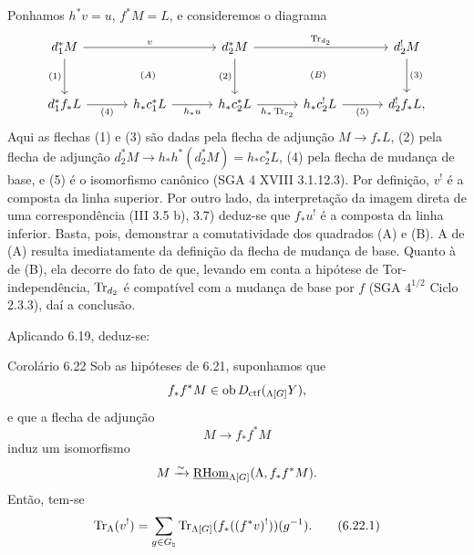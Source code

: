 Ponhamos $h^*v=u$, $f^*M=L$, e consideremos o diagrama
\[
\begin{tikzcd}[column sep=3.2em,row sep=large]
d_1^*M \arrow[rr,"v"] \arrow[d,"{(1)}"'] &&
d_2^*M \arrow[rr,"\Tr_{d_2}"] \arrow[d,"{(2)}"'] &&
d_2^!M \arrow[d,"{(3)}"]\\
d_1^*f_*L \arrow[r,"{(4)}"'] &
h_*c_1^*L \arrow[r,"h_*u"'] &
h_*c_2^*L \arrow[r,"h_*\Tr_{c_2}"'] &
h_*c_2^!L \arrow[r,"{(5)}"'] &
d_2^!f_*L,
\arrow[from=1-1,to=2-3, phantom, "\scriptstyle (A)"]
\arrow[from=1-3,to=2-5, phantom, "\scriptstyle (B)"]
\end{tikzcd}
\]
Aqui as flechas (1) e (3) são dadas pela flecha de adjunção $M\to f_*L$, (2) pela flecha de adjunção $d_2^*M\to h_*h^*(d_2^*M)=h_*c_2^*L$, (4) pela flecha de mudança de base, e (5) é o isomorfismo canônico (SGA 4 XVIII 3.1.12.3). Por definição, $v^!$ é a composta da linha superior. Por outro lado, da interpretação da imagem direta de uma correspondência (III 3.5 b), 3.7) deduz-se que $f_*u^!$ é a composta da linha inferior. Basta, pois, demonstrar a comutatividade dos quadrados (A) e (B). A de (A) resulta imediatamente da definição da flecha de mudança de base. Quanto à de (B), ela decorre do fato de que, levando em conta a hipótese de Tor-independência, $\operatorname{Tr}_{d_2}$ é compatível com a mudança de base por $f$ (SGA $4^{1/2}$ Ciclo 2.3.3), daí a conclusão.

Aplicando 6.19, deduz-se:

\begin{statement}{Corolário 6.22}
Sob as hipóteses de 6.21, suponhamos que
\[
f_*f^*M\in\operatorname{ob} D_{\mathrm{ctf}}({}_{\Lambda[G]}Y),
\]
e que a flecha de adjunção
\[
M\to f_*f^*M
\]
induz um isomorfismo
\[
M\xrightarrow{\sim}\underline{\mathrm{RHom}}_{\Lambda[G]}(\Lambda,f_*f^*M).
\]
Então, tem-se
\begin{equation}
\operatorname{Tr}_{\Lambda}(v^!)=
\sum_{g\in G_{\natural}}\operatorname{Tr}_{\Lambda[G]}(f_*((f^*v)^!))(g^{-1}).
\tag{6.22.1}
\end{equation}
\end{statement}

